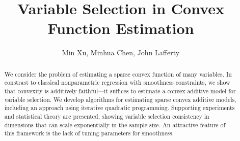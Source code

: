 \documentclass{article}
\title{Variable Selection in Convex Function Estimation}
\author{
Min Xu, Minhua Chen, John Lafferty
}
\numberwithin{equation}{section}
\theoremstyle{plain}
\theoremstyle{remark}
\begin{document}
\def\X{\mathcal{X}}
\def\comma{\unskip,~}
\def\truep{p^*}
\def\div{\|\,}
\long{}
\def\reals{{\mathbb R}}
\def\P{{\mathbb P}}
\def\E{{\mathbb E}}
\def\Cov{\mathop{\text{Cov}}}
\def\supp{\mathop{\text{supp}\kern.2ex}}
\def\argmin{\mathop{\text{\rm arg\,min}}}
\def\arginf{\mathop{\text{\rm arg\,inf}}}
\def\argmax{\mathop{\text{\rm arg\,max}}}
\let\tilde\widetilde
\def\csd{${}^*$}
\def\mld{${}^\dag$}
\def\dos{${}^\ddag$}
\def\W{\widetilde Y}
\def\Z{\widetilde X}
\let\hat\widehat
\let\tilde\widetilde
\def\given{{\,|\,}}
\def\ds{\displaystyle}
\def\bs{\backslash}
\def\1{{(1)}}
\def\2{{(2)}}
\def\pn{{(n)}}
\def\ip{{(i)}}
\def\Xbar{\overline{X}}
\def\except{\backslash}
\def\npn{\mathop{\textit{NPN\,}}}
\def\i{{(i)}}
\def\cE{{\mathcal{C}}}
\def\cM{{\mathcal{M}}}
\def\cF{{\mathcal{F}}}
\def\cP{{\mathcal{P}}}
\def\cG{{\mathcal{G}}}
\def\tr{\mathop{\text{tr}}}
\long{}
\def\ti#1{#1}
\def\titi#1{\textit{#1}}
\def\cram{{\sc cram}}
\def\spam{{\small\sc SpAM}}
\def\diag{\mathop{\rm diag}}
\def\ones{\mathbf{1}}
\def\threebars{\mbox{$|\kern-.25ex|\kern-.25ex|$}}
\def\fatnorm#1{\threebars #1 \threebars}
\def\rank{\mathop{\rm rank}}
\def\S{\mathcal{S}}
\def\H{\mathcal{H}}
\def\K{{K}}
\def\rank{\mathop{\rm rank}}
\def\half{{1/2}}
\def\Y{\mathbb{Y}}
\def\M{\mathbb{M}}
\def\F{\mathbb{F}}
\def\pinv{{-1}}
\def\Res{Z}
\def\Proj{P}
\def\cN{{\mathcal N}}
\def\cT{{\mathcal H}}
\def\coloneqq{:=}
\def\mathbf#1{\mbox{\boldmath $#1$}} 
\def\bar#1{\overline{#1}}




\maketitle

\begin{abstract}
  We consider the problem of estimating a sparse convex function of
  many variables.  In constrast to classical nonparametric
  regression with smoothness constraints, we show that convexity is
  additively faithful---it suffices to estimate a convex additive
  model for variable selection.  We develop algorithms for estimating
  sparse convex additive models, including an approach using iterative
  quadratic programming.  Supporting experiments and statistical
  theory are presented, showing variable selection consistency in
  dimensions that can scale exponentially in the sample size.  An
  attractive feature of this framework is the lack of tuning parameters
  for smoothness.
\end{abstract}
\vskip10pt


%








\clearpage



\newpage

\end{document}
